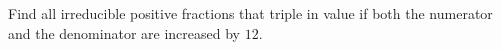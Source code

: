 Find all irreducible positive fractions that triple in value if both the numerator and the denominator are increased by $12$.
